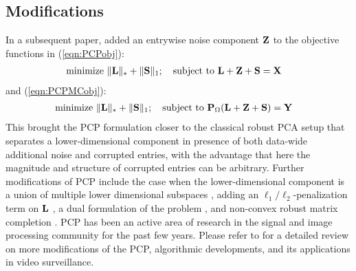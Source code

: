 \subsection*{\sffamily \large Modifications}
In a subsequent paper, \cite{ZhouEtal10} added an entrywise noise component ${\mathbf{Z}}$ to the objective functions in (\ref{eqn:PCPobj}):
%
\begin{align}\label{eqn:PCPobjZ}
& \text{minimize } \| {\mathbf{L}} \|_* + \| {\mathbf{S}} \|_1; \quad \text{subject to } {\mathbf{L}} + {\mathbf{Z}} + {\mathbf{S}} = {\mathbf{X}}
\end{align}
%
and (\ref{eqn:PCPMCobj}):
%
\begin{align}\label{eqn:PCPMCobjZ}
& \text{minimize } \| {\mathbf{L}} \|_* + \| {\mathbf{S}} \|_1; \quad \text{subject to } {\mathbf{P}}_\Omega({\mathbf{L}} + {\mathbf{Z}} + {\mathbf{S}}) = {\mathbf{Y}}
\end{align}
%
This brought the PCP formulation closer to the classical robust PCA setup that separates a lower-dimensional component in presence of both data-wide additional noise and corrupted entries, with the advantage that here the magnitude and structure of corrupted entries can be arbitrary. Further modifications of PCP include the case when the lower-dimensional component is a union of multiple lower dimensional subspaces \citep{WohlbergEtal12}, adding an $\ell_1/\ell_2$-penalization term on ${\mathbf{L}}$ \citep{TangNehorai11}, a dual formulation of the problem \citep{BeckerEtal11}, and non-convex robust matrix completion \citep{ShangEtal14}. PCP has been an active area of research in the signal and image processing community for the past few years. Please refer to \cite{Bouwmans14} for a detailed review on more modifications of the PCP, algorithmic developments, and its applications in video surveillance.